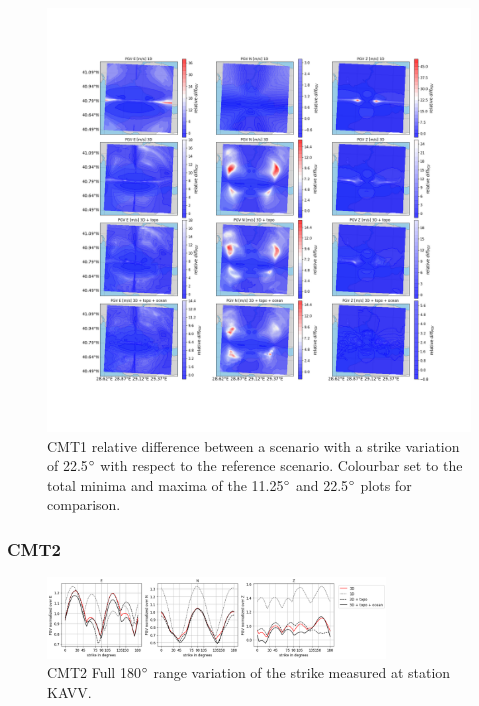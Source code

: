 \documentclass[../Text/00main.tex]{subfiles}
\begin{document}
\begin{figure}[h]
    \centering
    \includegraphics[width=1\linewidth, trim = 2cm 5cm 1cm 5cm, clip]{images_results/strike_variation_epsilon25_sc1.png}
    \caption{CMT1 relative difference between a scenario with a strike variation of 22.5$\degree$ with respect to the reference scenario. Colourbar set to the total minima and maxima of the 11.25$\degree$ and 22.5$\degree$ plots for comparison.}
    \label{fig:ref_eps25-1}
\end{figure}

\FloatBarrier

\subsubsection{CMT2}

\begin{figure}[!htp]
    \centering
    \includegraphics[width=0.8\textwidth]{images_results/fullrange_strikevar_maxvals_sc2.png}
    \caption{CMT2 Full 180$\degree$ range variation of the strike measured at station KAVV.}
    \label{fig:KAVV_fullrange_2}
\end{figure}
\end{document}
